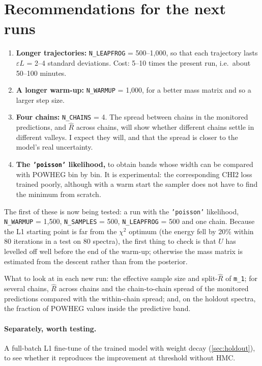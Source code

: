 \documentclass[11pt]{article}
\newcommand{\code}[1]{\texttt{#1}}
\begin{document}
\section{Recommendations for the next runs}
\label{sec:next}

\begin{enumerate}
  \item \textbf{Longer trajectories:} \code{N\_LEAPFROG} = 500--1,000, so that each
    trajectory lasts $\varepsilon L$ = 2--4 standard deviations. Cost: 5--10 times
    the present run, i.e.\ about 50--100 minutes.
  \item \textbf{A longer warm-up:} \code{N\_WARMUP} = 1,000, for a better mass matrix
    and so a larger step size.
  \item \textbf{Four chains:} \code{N\_CHAINS} = 4. The spread between chains in the
    monitored predictions, and $\hat R$ across chains, will show whether different
    chains settle in different valleys. I expect they will, and that the spread is
    closer to the model's real uncertainty.
  \item \textbf{The \code{'poisson'} likelihood,} to obtain bands whose width can be
    compared with POWHEG bin by bin. It is experimental: the corresponding CHI2 loss
    trained poorly, although with a warm start the sampler does not have to find the
    minimum from scratch.
\end{enumerate}

\noindent The first of these is now being tested: a run with the \code{'poisson'}
likelihood, \code{N\_WARMUP} = 1,500, \code{N\_SAMPLES} = 500, \code{N\_LEAPFROG} = 500
and one chain. Because the L1 starting point is far from the $\chi^2$ optimum
(the energy fell by 20\% within 80 iterations in a test on 80 spectra), the first thing
to check is that $U$ has levelled off well before the end of the warm-up; otherwise the
mass matrix is estimated from the descent rather than from the posterior.

\noindent What to look at in each new run: the effective sample size and split-$\hat R$ of
\code{m\_1}; for several chains, $\hat R$ across chains and the chain-to-chain spread
of the monitored predictions compared with the within-chain spread; and, on the
holdout spectra, the fraction of POWHEG values inside the predictive band.

\paragraph{Separately, worth testing.} A full-batch L1 fine-tune of the trained model
with weight decay (\cref{sec:holdout}), to see whether it reproduces the improvement at
threshold without HMC.
\end{document}

